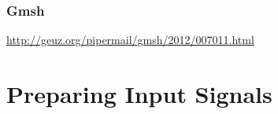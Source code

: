 \subsubsection{Gmsh}
\url{http://geuz.org/pipermail/gmsh/2012/007011.html}

\section{Preparing Input Signals}
